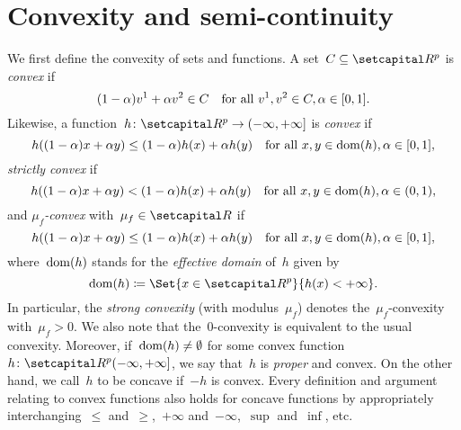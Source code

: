 \documentclass[../main]{subfiles}
\begin{document}
\section{Convexity and semi-continuity} 
We first define the convexity of sets and functions.
A set~$C \subseteq \setR^p$ is \emph{convex} if
\begin{equation}
    (1 - \alpha) v^1 + \alpha v^2 \in C \quad \text{for all~$v^1, v^2 \in C, \alpha \in [0, 1]$}
    .\end{equation}
Likewise, a function~$h \colon \setR^p \to (-\infty, +\infty]$ is \emph{convex} if
\begin{equation}
    h((1 - \alpha) x + \alpha y) \le (1 - \alpha) h(x) + \alpha h(y) \quad \text{for all~$x, y \in \operatorname{dom}(h), \alpha \in [0, 1]$}
    ,\end{equation}
\emph{strictly convex} if
\begin{equation}
    h((1 - \alpha) x + \alpha y) < (1 - \alpha) h(x) + \alpha h(y) \quad \text{for all~$x, y \in \operatorname{dom}(h), \alpha \in (0, 1)$}
    ,\end{equation}
and \emph{$\mu_f$-convex} with~$\mu_f \in \setR$ if
\begin{equation}
    h((1 - \alpha) x + \alpha y) \le (1 - \alpha) h(x) + \alpha h(y) \quad \text{for all~$x, y \in \operatorname{dom}(h), \alpha \in [0, 1]$}
    ,\end{equation}
where~$\operatorname{dom}(h)$ stands for the \emph{effective domain} of~$h$ given by
\begin{equation}
    \dom(h) \coloneqq \Set{x \in \setR^p}{h(x) < + \infty}
    .\end{equation}
In particular, the \emph{strong convexity} (with modulus~$\mu_f$) denotes the~$\mu_f$-convexity with~$\mu_f > 0$.
We also note that the~$0$-convexity is equivalent to the usual convexity.
Moreover, if~$\operatorname{dom}(h) \neq \emptyset$ for some convex function~$h \colon \setR^p (- \infty, + \infty]$, we say that~$h$ is \emph{proper} and convex.
On the other hand, we call~$h$ to be concave if~$- h$ is convex.
Every definition and argument relating to convex functions also holds for concave functions by appropriately interchanging~$\le$ and~$\ge$,~$+ \infty$ and~$- \infty$,~$\sup$ and~$\inf$, etc.
\end{document}
